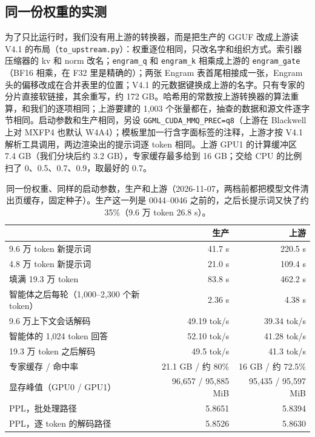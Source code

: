 \documentclass[11pt,a4paper]{article}
\newcommand{\code}[1]{\texttt{#1}}
\newcommand{\tps}{tok/s}
\begin{document}
\subsection{同一份权重的实测}
\label{sec:upstreambench}

为了只比运行时，我们没有用上游的转换器，而是把生产的 GGUF 改成上游读 V4.1 的布局（\code{to\_upstream.py}）：权重逐位相同，只改名字和组织方式。索引器压缩器的 kv 和 norm 改名；\code{engram\_q} 和 \code{engram\_k} 相乘成上游的 \code{engram\_gate}（BF16 相乘，在 F32 里是精确的）；两张 Engram 表首尾相接成一张，Engram 头的偏移改成在合并表里的位置；V4.1 的元数据键换成上游的名字。只有专家的分片直接软链接，其余重写，约 172 GB。哈希用的常数按上游转换器的算法重算，和我们的逐项相同；上游要建的 1,003 个张量都在，抽查的数据和源文件逐字节相同。启动参数和生产相同，另设 \code{GGML\_CUDA\_MMQ\_PREC=q8}（上游在 Blackwell 上对 MXFP4 也默认 W4A4）；模板里加一行含字面标签的注释，上游才按 V4.1 解析工具调用，两边渲染出的提示词逐 token 相同。上游 GPU1 的计算缓冲区 7.4 GB（我们分块后约 3.2 GB），专家缓存最多给到 16 GB；交给 CPU 的比例扫了 0、0.5、0.7、0.9，取最好的 0.7。

\begin{table}[h]
  \centering
  \small
  \caption{同一份权重、同样的启动参数，生产和上游（2026-11-07，两档前都把模型文件清出页缓存，固定种子）。生产这一列是 0044--0046 之前的，之后长提示词又快了约 35\%（9.6 万 token 26.8 s）。}
  \label{tab:upstream}
  \begin{tabular}{@{}l r r@{}}
    \toprule
     & 生产 & 上游 \\
    \midrule
    9.6 万 token 新提示词 & 41.7 s & 220.5 s \\
    4.8 万 token 新提示词 & 21.0 s & 109.4 s \\
    填满 19.3 万 token & 83.8 s & 462.2 s \\
    智能体之后每轮（1,000--2,300 个新 token） & 2.36 s & 4.38 s \\
    9.6 万上下文会话解码 & 49.19 \tps{} & 39.34 \tps{} \\
    智能体的 1,024 token 回答 & 52.10 \tps{} & 41.28 \tps{} \\
    19.3 万 token 之后解码 & 49.5 \tps{} & 41.3 \tps{} \\
    专家缓存 / 命中率 & 21.1 GB / 约 80\% & 16 GB / 约 72.5\% \\
    显存峰值（GPU0 / GPU1） & 96,657 / 95,885 MiB & 95,435 / 95,597 MiB \\
    PPL，批处理路径 & 5.8651 & 5.8394 \\
    PPL，逐 token 的解码路径 & 5.8526 & 5.8630 \\
    \bottomrule
  \end{tabular}
\end{table}
\end{document}
